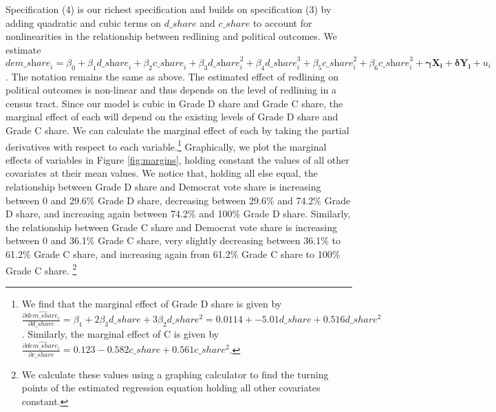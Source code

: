 \documentclass{eco_375_paper}
\begin{document}
Specification (4) is our richest specification and builds on specification (3) by adding quadratic and cubic terms on $d\_share$ and $c\_share$  to account for nonlinearities in the relationship between redlining and political outcomes. We estimate ${\textit{dem\_share}_i} = {\beta_0} + {\beta_1}{\textit{d\_share}_i} + {\beta_2}{\textit{c\_share}_i} + {\beta_3}{\textit{d\_share}_i^2} + {\beta_4}{\textit{d\_share}_i^3} + {\beta_5}{\textit{c\_share}_i^2} + {\beta_6}{\textit{c\_share}_i^3} + \boldsymbol{{\gamma}} \boldsymbol{X_i} + \boldsymbol{{\delta}} \boldsymbol{Y_i} + u_i$. The notation remains the same as above. The estimated effect of redlining on political outcomes is non-linear and thus depends on the level of redlining in a census tract. Since our model is cubic in Grade D share and Grade C share, the marginal effect of each will depend on the existing levels of Grade D share and Grade C share. We can calculate the marginal effect of each by taking the partial derivatives with respect to each variable.\footnote{We find that the marginal effect of Grade D share is given by $\frac{\partial \hat{dem\_share_i}}{\partial d\_share} = \beta_1 + 2\beta_3  d\_share + 3 \beta_2 d\_share^2 = 0.0114 + -5.01 d\_share + 0.516 d\_share^2$. Similarly, the marginal effect of C is given by  $\frac{\partial \hat{dem\_share_i}}{\partial c\_share} = 0.123 - 0.582 c\_share + 0.561 c\_share^2$.} Graphically, we plot the marginal effects of variables in Figure \ref{fig:margins}, holding constant the values of all other covariates at their mean values. We notice that, holding all else equal, the relationship between Grade D share and Democrat vote share is increasing between 0 and 29.6\% Grade D share, decreasing between 29.6\% and 74.2\% Grade D share, and increasing again between 74.2\% and 100\% Grade D share. Similarly, the relationship between Grade C share and Democrat vote share is increasing between 0 and 36.1\% Grade C share, very slightly decreasing between 36.1\% to 61.2\% Grade C share, and increasing again from 61.2\% Grade C share to 100\% Grade C share. \footnote{We calculate these values using a graphing calculator to find the turning points of the estimated regression equation holding all other covariates constant.} 
\end{document}
